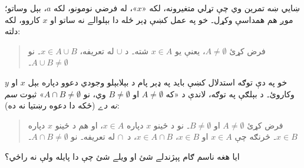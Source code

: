 \documentclass[../../../include/open-logic-section]{subfiles}
\begin{document}
ښايي ښه تمرين وي چې تړلي متغيرونه،
لکه «$x$»، له فرضي نومونو،
لکه $a$، بېل وساتو؛ موږ هم
همداسې وکړل۔ خو په عمل کښې
ډېر ځله دا بېلوالے نه ساتو
او $x$ کاروو، لکه دلته:
\begin{quote}
فرض کړئ $A \neq \emptyset$،
يعنې يو $x \in A$ شته۔
د $\cup$ له تعريفه،
$x \in A \cup B$۔
نو $A \cup B \neq \emptyset$۔
\end{quote}
خو په دې توګه استدلال
کښې بايد په ډېر پام
د بېلابېلو وجودي دعوو
دپاره بېل $x$ او $y$
وکاروئ۔ د بېلګې په توګه،
لاندې د «که $A \neq
\emptyset$ او $B \neq \emptyset$
وي، نو $A \cap B \neq \emptyset$»
ثبوت \emph{سم نه دے} (ځکه
دا دعوه رښتيا نه ده):
\begin{quote}
فرض کړئ $A \neq \emptyset$
او $B \neq \emptyset$۔
نو د ځينو $x$ دپاره
$x \in A$، او هم د ځينو
$x$ دپاره $x \in B$۔
څرنګه چې $x \in A$
او $x \in
B$، $x \in A \cap B$،
د~$\cap$ له تعريفه۔
نو $A \cap B \neq
\emptyset$۔
\end{quote}
ايا هغه ناسم ګام پېژندلے
شئ او ويلے شئ چې دا
پايله ولې نه راځي؟
\end{document}
